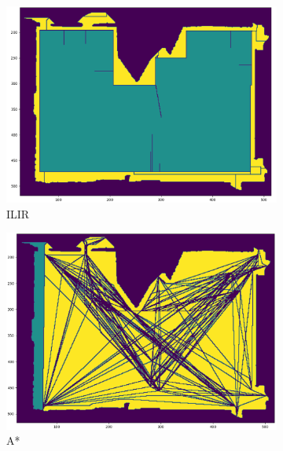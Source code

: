 \begin{figure}[h]
    \captionsetup[subfigure]{justification=centering}
    \centering
    \begin{subfigure}{.35\textwidth}
      \centering
      \includegraphics[width=\textwidth]{figures/60_results/room9_disturbance_ilir.png}
      \caption{ILIR}
    \end{subfigure}%
    \begin{subfigure}{.35\textwidth}
      \centering
      \includegraphics[width=\textwidth]{figures/60_results/room9_disturbance_astar.png}
      \caption{A*}
    \end{subfigure}
    \begin{subfigure}{.35\textwidth}
      \centering

\end{subfigure}
\end{figure}
